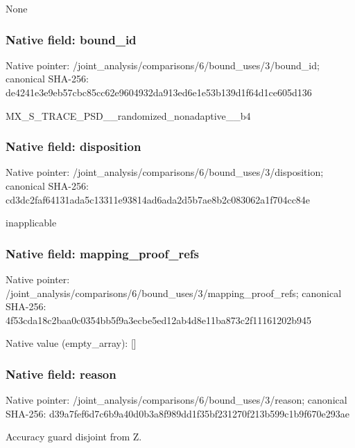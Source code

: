 \documentclass[10pt,a4paper]{article}
\begin{document}
\begingroup\raggedright\sloppy None\par\endgroup

\subsubsection{Native field: bound\_\allowbreak{}id}
Native pointer: /joint\_\allowbreak{}analysis/comparisons/6/bound\_\allowbreak{}uses/3/bound\_\allowbreak{}id; canonical SHA-256: de4241e3e9eb57cbc85cc62e9604932da913ed6e1e53b139d1f64d1ce605d136

\begingroup\raggedright\sloppy MX\_\allowbreak{}S\_\allowbreak{}TRACE\_\allowbreak{}PSD\_\allowbreak{}\_\allowbreak{}randomized\_\allowbreak{}nonadaptive\_\allowbreak{}\_\allowbreak{}b4\par\endgroup

\subsubsection{Native field: disposition}
Native pointer: /joint\_\allowbreak{}analysis/comparisons/6/bound\_\allowbreak{}uses/3/disposition; canonical SHA-256: cd3dc2faf64131ada5c13311e93814ad6ada2d5b7ae8b2c083062a1f704cc84e

\begingroup\raggedright\sloppy inapplicable\par\endgroup

\subsubsection{Native field: mapping\_\allowbreak{}proof\_\allowbreak{}refs}
Native pointer: /joint\_\allowbreak{}analysis/comparisons/6/bound\_\allowbreak{}uses/3/mapping\_\allowbreak{}proof\_\allowbreak{}refs; canonical SHA-256: 4f53cda18c2baa0c0354bb5f9a3ecbe5ed12ab4d8e11ba873c2f11161202b945

Native value (empty\_\allowbreak{}array): []

\subsubsection{Native field: reason}
Native pointer: /joint\_\allowbreak{}analysis/comparisons/6/bound\_\allowbreak{}uses/3/reason; canonical SHA-256: d39a7fef6d7c6b9a40d0b3a8f989dd1f35bf231270f213b599c1b9f670e293ae

\begingroup\raggedright\sloppy Accuracy guard disjoint from Z.\par\endgroup
\end{document}
